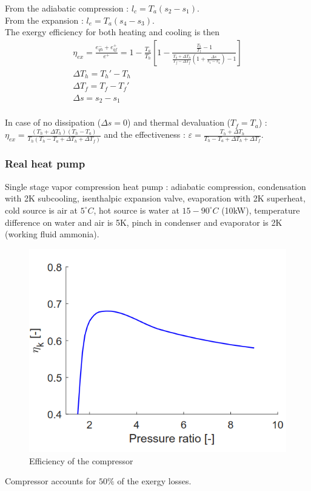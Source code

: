 \documentclass[../main.tex]{subfiles}
\begin{document}
From the adiabatic compression : $l_c = T_a(s_2-s_1)$.\\
From the expansion : $l_e = T_a(s_4-s_3)$.\\

The exergy efficiency for both heating and cooling is then \begin{equation}\begin{gathered}
    \eta_{ex} = \frac{e_{qh}^-+e_{qf}^+}{e^+} = 1-\frac{T_a}{T_h} [1- \frac{\frac{T_h}{T_f}-1}{\frac{T_h+\Delta T_h}{T_f-\Delta T_f} (1+\frac{\Delta s}{s_1-s_4})-1}]\\
    \Delta T_h = T_h'-T_h\\
    \Delta T_f = T_f-T_f'\\
    \Delta s = s_2-s_1\\
    \end{gathered}
\end{equation}

In case of no dissipation ($\Delta s=0$) and thermal devaluation ($T_f = T_a$) : $\eta_{ex} = \frac{(T_h+\Delta T_h)(T_h-T_a)}{T_h(T_h-T_a+\Delta T_h + \Delta T_f)}$ and the effectiveness : $\varepsilon = \frac{T_h+\Delta T_h}{T_h-T_a + \Delta T_h+ \Delta T_f}$.\\

\subsubsection{Real heat pump}
Single stage vapor compression heat pump : adiabatic compression, condensation with 2K subcooling, isenthalpic expansion valve, evaporation with 2K superheat, cold source is air at $5^\circ C$, hot source is water at $15-90^\circ C$ (10kW), temperature difference on water and air is 5K, pinch in condenser and evaporator is 2K (working fluid ammonia).\\

\begin{figure}[hbt!]
    \centering
    \includegraphics[width=0.5\linewidth]{IMAGES/HP/Screenshot from 2025-03-20 10-25-37.png}
    \caption{Efficiency of the compressor}
\end{figure}
Compressor accounts for $50\%$ of the exergy losses. \\
\end{document}

